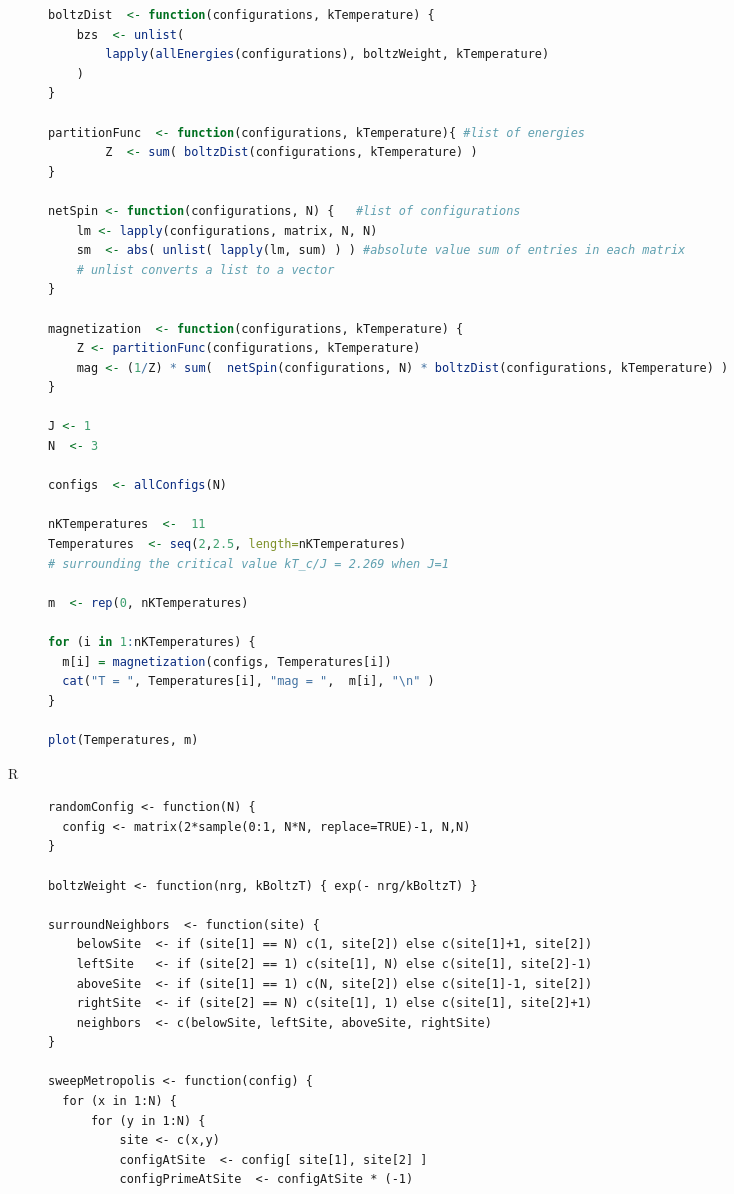 \begin{description}
\begin{lstlisting}[language=R]
boltzDist  <- function(configurations, kTemperature) {
    bzs  <- unlist(
        lapply(allEnergies(configurations), boltzWeight, kTemperature)
    )
}

partitionFunc  <- function(configurations, kTemperature){ #list of energies
        Z  <- sum( boltzDist(configurations, kTemperature) )
}

netSpin <- function(configurations, N) {   #list of configurations
    lm <- lapply(configurations, matrix, N, N)
    sm  <- abs( unlist( lapply(lm, sum) ) ) #absolute value sum of entries in each matrix
    # unlist converts a list to a vector
}

magnetization  <- function(configurations, kTemperature) {
    Z <- partitionFunc(configurations, kTemperature)
    mag <- (1/Z) * sum(  netSpin(configurations, N) * boltzDist(configurations, kTemperature) )
}

J <- 1
N  <- 3

configs  <- allConfigs(N)

nKTemperatures  <-  11
Temperatures  <- seq(2,2.5, length=nKTemperatures)
# surrounding the critical value kT_c/J = 2.269 when J=1

m  <- rep(0, nKTemperatures)

for (i in 1:nKTemperatures) {
  m[i] = magnetization(configs, Temperatures[i])  
  cat("T = ", Temperatures[i], "mag = ",  m[i], "\n" )
}

plot(Temperatures, m)

\end{lstlisting}

\item[R] 


\begin{lstlisting}
randomConfig <- function(N) {
  config <- matrix(2*sample(0:1, N*N, replace=TRUE)-1, N,N)
}

boltzWeight <- function(nrg, kBoltzT) { exp(- nrg/kBoltzT) }

surroundNeighbors  <- function(site) {
    belowSite  <- if (site[1] == N) c(1, site[2]) else c(site[1]+1, site[2])
    leftSite   <- if (site[2] == 1) c(site[1], N) else c(site[1], site[2]-1)
    aboveSite  <- if (site[1] == 1) c(N, site[2]) else c(site[1]-1, site[2])
    rightSite  <- if (site[2] == N) c(site[1], 1) else c(site[1], site[2]+1)
    neighbors  <- c(belowSite, leftSite, aboveSite, rightSite)
}

sweepMetropolis <- function(config) {
  for (x in 1:N) {
      for (y in 1:N) {
          site <- c(x,y)
          configAtSite  <- config[ site[1], site[2] ]
          configPrimeAtSite  <- configAtSite * (-1)


\end{lstlisting}
\end{description}
